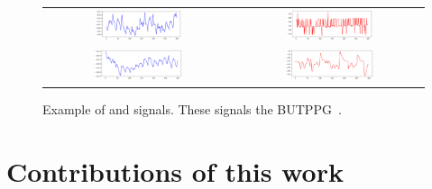 \begin{figure}[h!]
    {
    \def\arraystretch{1}
    \setlength{\tabcolsep}{2pt}
    \begin{tabular}{cc}
        \includegraphics[width=0.48\textwidth, trim={1.5em 0 0em 0}, clip]{img/samples/butppg_111001.png} 
        & \includegraphics[width=0.48\textwidth, trim={1.5em 0 0em 0}, clip]{img/samples/butppg_111003.png} \\
        \includegraphics[width=0.49\textwidth, trim={1.5em 0 0em 0}, clip]{img/samples/butppg_111002.png} 
        & \includegraphics[width=0.49\textwidth, trim={1em 0 0em 0}, clip]{img/samples/butppg_111004.png} \\
    \end{tabular}
    }
    \caption[]{Example of  and   signals. These signals  the \acrlong{BUTPPG}~\protect\cite{butppg}.}
    \label{fig:butppg_samples}
\end{figure}

\section{Contributions of this work}
\label{sec:my_work}

